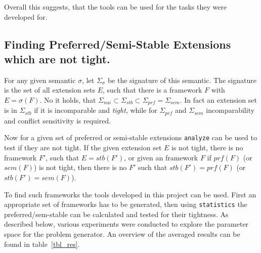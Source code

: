 \documentclass[parskip=half]{scrartcl}
\begin{document}
Overall this suggests, that the tools can be used for the tasks they were
developed for.

\subsection{Finding Preferred/Semi-Stable Extensions which are not tight.}

For any given semantic $\sigma$, let $\Sigma_{\sigma}$ be the signature of this
semantic. The signature is the set of all extension sets $E$, such that there is a
framework $F$ with $E=\sigma(F)$. No it holds, that $\Sigma_{nai}\subset
\Sigma_{stb}\subset\Sigma_{prf}=\Sigma_{sem}$. In fact an extension set is in $\Sigma_{stb}$
if it is incomparable and \emph{tight}, while for $\Sigma_{prf}$ and $\Sigma_{sem}$
incomparability and conflict sensitivity is required.

Now for a given set of preferred or semi-stable extensions \texttt{analyze} can be used
to test if they are not tight. If the given extension set $E$ is not tight, there is
no framework $F'$, such that $E=stb(F')$, or given an framework $F$ if $prf(F)$ (or $sem(F)$)
is not tight, then there is no $F'$ such that $stb(F')=prf(F)$ (or $stb(F')=sem(F)$).

To find such frameworks the tools developed in this project can be used. First an
appropriate set of frameworks has to be generated, then using \texttt{statistics} the
preferred/sem-stable can be calculated and tested for their tightness. As described below,
various experiments were conducted to explore the parameter space for the problem generator.
An overview of the averaged results can be found in table~\ref{tbl_res}.
\end{document}
